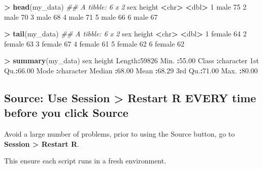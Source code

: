 \documentclass[
]{krantz}
\makeatletter
\newenvironment{Shaded}{\begin{snugshade}}{\end{snugshade}}
\newcommand{\CommentTok}[1]{\textcolor[rgb]{0.37,0.37,0.37}{\textit{#1}}}
\newcommand{\DecValTok}[1]{\textcolor[rgb]{0.06,0.06,0.06}{#1}}
\newcommand{\ErrorTok}[1]{\textcolor[rgb]{0.14,0.14,0.14}{\textbf{#1}}}
\newcommand{\FloatTok}[1]{\textcolor[rgb]{0.06,0.06,0.06}{#1}}
\newcommand{\KeywordTok}[1]{\textcolor[rgb]{0.27,0.27,0.27}{\textbf{#1}}}
\newcommand{\NormalTok}[1]{#1}
\newcommand{\OperatorTok}[1]{\textcolor[rgb]{0.43,0.43,0.43}{\textbf{#1}}}
\newcommand{\StringTok}[1]{\textcolor[rgb]{0.5,0.5,0.5}{#1}}
\newenvironment{kframe}{%
\medskip{}
\setlength{\fboxsep}{.8em}
 \def\at@end@of@kframe{}%
 \ifinner\ifhmode%
  \def\at@end@of@kframe{\end{minipage}}%
  \begin{minipage}{\columnwidth}%
 \fi\fi%
 \def\FrameCommand##1{\hskip\@totalleftmargin \hskip-\fboxsep
 \colorbox{shadecolor}{##1}\hskip-\fboxsep
     \hskip-\linewidth \hskip-\@totalleftmargin \hskip\columnwidth}%
 \MakeFramed {\advance\hsize-\width
   \@totalleftmargin\z@ \linewidth\hsize
   \@setminipage}}%
 {\par\unskip\endMakeFramed%
 \at@end@of@kframe}
\renewenvironment{Shaded}{\begin{kframe}}{\end{kframe}}
\makeatother
\begin{document}
\begin{Shaded}
\begin{Highlighting}[]
\OperatorTok{>}\StringTok{ }\KeywordTok{head}\NormalTok{(my_data)}
\CommentTok{## A tibble: 6 x 2}
\NormalTok{  sex   height}
  \OperatorTok{<}\NormalTok{chr}\OperatorTok{>}\StringTok{  }\ErrorTok{<}\NormalTok{dbl}\OperatorTok{>}
\DecValTok{1}\NormalTok{ male      }\DecValTok{75}
\DecValTok{2}\NormalTok{ male      }\DecValTok{70}
\DecValTok{3}\NormalTok{ male      }\DecValTok{68}
\DecValTok{4}\NormalTok{ male      }\DecValTok{71}
\DecValTok{5}\NormalTok{ male      }\DecValTok{66}
\DecValTok{6}\NormalTok{ male      }\DecValTok{67}

\OperatorTok{>}\StringTok{ }\KeywordTok{tail}\NormalTok{(my_data)}
\CommentTok{## A tibble: 6 x 2}
\NormalTok{  sex    height}
  \OperatorTok{<}\NormalTok{chr}\OperatorTok{>}\StringTok{   }\ErrorTok{<}\NormalTok{dbl}\OperatorTok{>}
\DecValTok{1}\NormalTok{ female     }\DecValTok{64}
\DecValTok{2}\NormalTok{ female     }\DecValTok{63}
\DecValTok{3}\NormalTok{ female     }\DecValTok{67}
\DecValTok{4}\NormalTok{ female     }\DecValTok{61}
\DecValTok{5}\NormalTok{ female     }\DecValTok{62}
\DecValTok{6}\NormalTok{ female     }\DecValTok{62}

\OperatorTok{>}\StringTok{ }\KeywordTok{summary}\NormalTok{(my_data)}
\NormalTok{     sex                height     }
\NormalTok{ Length}\OperatorTok{:}\DecValTok{59826}\NormalTok{       Min.   }\OperatorTok{:}\FloatTok{55.00}  
\NormalTok{ Class }\OperatorTok{:}\NormalTok{character   1st Qu.}\OperatorTok{:}\FloatTok{66.00}  
\NormalTok{ Mode  }\OperatorTok{:}\NormalTok{character   Median }\OperatorTok{:}\FloatTok{68.00}  
\NormalTok{                    Mean   }\OperatorTok{:}\FloatTok{68.29}  
\NormalTok{                    3rd Qu.}\OperatorTok{:}\FloatTok{71.00}  
\NormalTok{                    Max.   }\OperatorTok{:}\FloatTok{80.00}  
\end{Highlighting}
\end{Shaded}

\hypertarget{source-use-session-restart-r-every-time-before-you-click-source}{%
\subsection{Source: Use Session \textgreater{} Restart R EVERY time before you click Source}\label{source-use-session-restart-r-every-time-before-you-click-source}}

Avoid a large number of problems, prior to using the Source button, go to \textbf{Session \textgreater{} Restart R}.

This ensure each script runs in a fresh environment.
\end{document}
